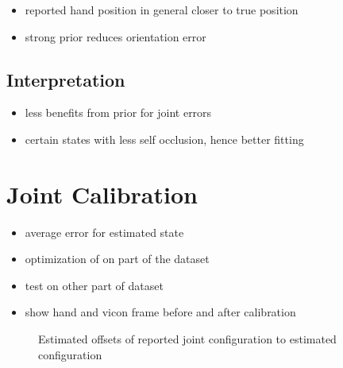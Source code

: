 \begin{itemize}
\item reported hand position in general closer to true position
\item strong prior reduces orientation error
\end{itemize}

\subsection{Interpretation}

\begin{itemize}
\item less benefits from prior for joint errors
\item certain states with less self occlusion, hence better fitting
\end{itemize}


\section{Joint Calibration}

\begin{itemize}
\item average error for estimated state
\item optimization of on part of the dataset
\item test on other part of dataset
\item show hand and vicon frame before and after calibration
\end{itemize}

\begin{figure}
\centering
{}

\caption{Estimated offsets of reported joint configuration to estimated configuration}
\end{figure}


